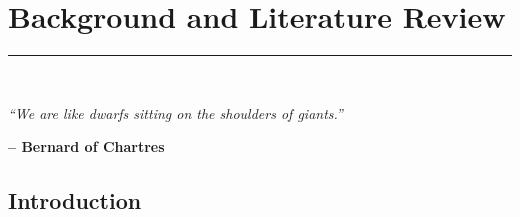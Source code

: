 \graphicspath{{content/chapters/2_background/figures/}}

\chapter{Background and Literature Review}%
\label{chp:background}
\rule{\textwidth}{1pt} \\[1ex]
\epigraph{\textit{``We are like dwarfs sitting on the shoulders of giants.''}}{\textbf{-- Bernard of Chartres}}

\section{Introduction}
\label{sec:2_introduction}

